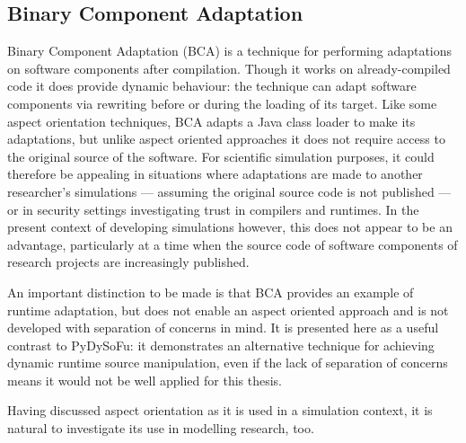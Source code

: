 \subsection{Binary Component Adaptation}\label{subsec:BCA} Binary Component
Adaptation\cite{keller1998binary} (BCA) is a technique for performing
adaptations on software components after compilation. Though it works on
already-compiled code it does provide dynamic behaviour: the technique can adapt
software components via rewriting before or during the loading of its target.
Like some aspect orientation techniques, BCA adapts a Java class
loader to make its adaptations, but unlike aspect oriented approaches it does
not require access to the original source of the software. For scientific
simulation purposes, it could therefore be appealing in situations where
adaptations are made to another researcher's simulations --- assuming the
original source code is not published --- or in security settings investigating
trust in compilers and runtimes\cite{trustingtrust}. In the present context of
developing \sociotechnical simulations however, this does not appear to be an
advantage, particularly at a time when the source code of software components of
research projects are increasingly published.

An important distinction to be made is that BCA provides an example of runtime
adaptation, but does not enable an aspect oriented approach and is not developed
with separation of concerns in mind. It is presented here as a useful contrast
to PyDySoFu: it demonstrates an alternative technique for achieving dynamic
runtime source manipulation, even if the lack of separation of concerns means it
would not be well applied for this thesis.











Having discussed aspect orientation as it is used in a simulation context, it is
natural to investigate its use in modelling research, too.

